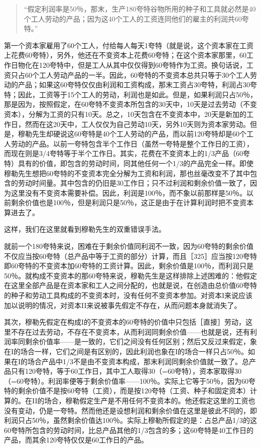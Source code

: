 \begin{quote}{“假定利润率是50％，那末，生产180夸特谷物所用的种子和工具就必然是40个工人劳动的产品；因为这40个工人的工资连同他们的雇主的利润共60夸特。”}\end{quote}

第一个资本家雇用了60个工人，付给每人每天1夸特（就是说，这个资本家在工资上花费60夸特），另外，他还在不变资本上花费60夸特；在这个资本家那里，60工作日物化在120夸特中，但是工人从其中仅仅得到60夸特作为工资。换句话说，工资只占60个工人劳动产品的一半。因此，60夸特的不变资本总共只等于30个工人劳动的产品；如果这60夸特仅仅由利润和工资构成，那末工资占30夸特，利润占30夸特；因此，工资等于15个工人的劳动，利润也是如此。但是，如果利润只占50％，那是因为，按照假定，在60夸特不变资本所包含的30天中，10天是过去劳动（不变资本），分解为工资的只有10天。总之，10天包含在不变资本中，20天是新加的工作日，然而在这20天中，工人仅仅为自己劳动10天，另外10天则为资本家劳动。但是，穆勒先生却硬说这60夸特是40个工人劳动的产品，而以前120夸特却是60个工人劳动的产品。以前一夸特包含半个工作日（虽然一夸特是整个工作日的工资），而现在则是3/4夸特等于半个工作日。其实，花费在不变资本上的1/3产品（60夸特）具有的价值，即包含的劳动时间，同其他任何一个1/3的产品完全一样。即使穆勒先生想把60夸特的不变资本完全分解为工资和利润，那也丝毫改变不了其中包含的劳动时间量。其中包含的仍旧是30工作日；只不过利润和剩余价值一致了，因为这里没有不变资本需要补偿。因此，利润是100％，而不象以前那样是50％。以前剩余价值也是100％，但是利润只是50％，这正是由于在计算利润时把不变资本算进去了。

这样，我们在这里就看到穆勒先生的双重错误手法。

就前一个180夸特来说，困难在于剩余价值同利润不一致，因为60夸特的剩余价值不仅应当按60夸特（总产品中等于工资的部分）计算，而且［325］应当按120夸特即60夸特的不变资本加60夸特的工资计算。因此，剩余价值是100％，而利润只是50％。就构成不变资本的那60夸特来说，穆勒先生是这样排除上述困难的：他假定在这里全部产品是在资本家和工人之间分配的，也就是说，在创造由总价值60夸特的种子和劳动工具构成的不变资本时，没有任何不变资本参加。对资本I来说应该加以说明的情况，对资本II来说被事先假定不存在，从而问题本身就消失了。

其次，穆勒先假定在构成I的不变资本的60夸特的价值中只包括［直接］劳动，这里不存在过去劳动，不存在不变资本，从而利润同剩余价值——也就是说，还有利润率同剩余价值率——是一致的，它们之间没有任何区别；然后又反过来假定，象在I的场合一样，它们之间是有区别的，因此利润也象在I的场合一样只占50％。如果在I的场合产品中1/3不是由不变资本构成，那末利润同剩余价值就一致了。总产品只有120夸特，等于60工作日，其中工人取得30（=60夸特），资本家取得30（=60夸特）。利润率便等于剩余价值率——100％。实际上它等于50％，因为60夸特的剩余价值不是按60夸特（工资），而是按120夸特（工资、种子和固定资本）计算的。在II的场合，穆勒假定生产是不用任何不变资本的。他还假定这里的工资也没有变动，仍是一夸特。然而他还是设想利润和剩余价值在这里是彼此不同的，即利润只占50％，虽然剩余价值达100％。实际上穆勒所假定的是：占总产品1/3的这60夸特所包含的劳动时间，比总产品其他的1/3包含的多；这60夸特是40工作日的产品，而其余120夸特仅仅是60工作日的产品。

